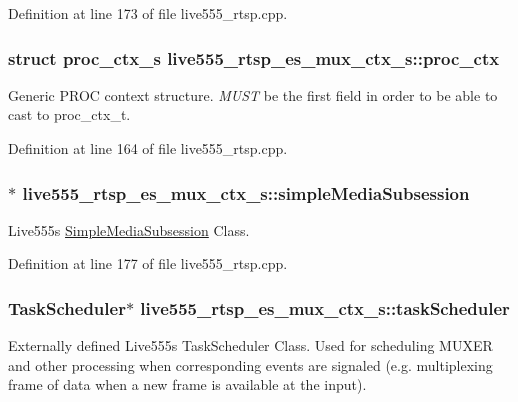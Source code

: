 Definition at line 173 of file live555\+\_\+rtsp.\+cpp.

\subsubsection[{\texorpdfstring{proc\+\_\+ctx}{proc_ctx}}]{\setlength{\rightskip}{0pt plus 5cm}struct {\bf proc\+\_\+ctx\+\_\+s} live555\+\_\+rtsp\+\_\+es\+\_\+mux\+\_\+ctx\+\_\+s\+::proc\+\_\+ctx}\hypertarget{structlive555__rtsp__es__mux__ctx__s_ad52255c06dde0cfdd45ec10c481fecb5}{}\label{structlive555__rtsp__es__mux__ctx__s_ad52255c06dde0cfdd45ec10c481fecb5}
Generic P\+R\+OC context structure. {\itshape M\+U\+ST} be the first field in order to be able to cast to proc\+\_\+ctx\+\_\+t. 

Definition at line 164 of file live555\+\_\+rtsp.\+cpp.

\subsubsection[{\texorpdfstring{simple\+Media\+Subsession}{simpleMediaSubsession}}]{$\ast$ live555\+\_\+rtsp\+\_\+es\+\_\+mux\+\_\+ctx\+\_\+s\+::simple\+Media\+Subsession}\hypertarget{structlive555__rtsp__es__mux__ctx__s_a066290959c314f7c0c51532b3124d644}{}\label{structlive555__rtsp__es__mux__ctx__s_a066290959c314f7c0c51532b3124d644}
Live555\textquotesingle{}s \hyperlink{classSimpleMediaSubsession}{Simple\+Media\+Subsession} Class. 

Definition at line 177 of file live555\+\_\+rtsp.\+cpp.

\subsubsection[{\texorpdfstring{task\+Scheduler}{taskScheduler}}]{\setlength{\rightskip}{0pt plus 5cm}Task\+Scheduler$\ast$ live555\+\_\+rtsp\+\_\+es\+\_\+mux\+\_\+ctx\+\_\+s\+::task\+Scheduler}\hypertarget{structlive555__rtsp__es__mux__ctx__s_a75ac022442f9544fc6a0d190257e37ee}{}\label{structlive555__rtsp__es__mux__ctx__s_a75ac022442f9544fc6a0d190257e37ee}
Externally defined Live555\textquotesingle{}s Task\+Scheduler Class. Used for scheduling M\+U\+X\+ER and other processing when corresponding events are signaled (e.\+g. multiplexing frame of data when a new frame is available at the input). 

